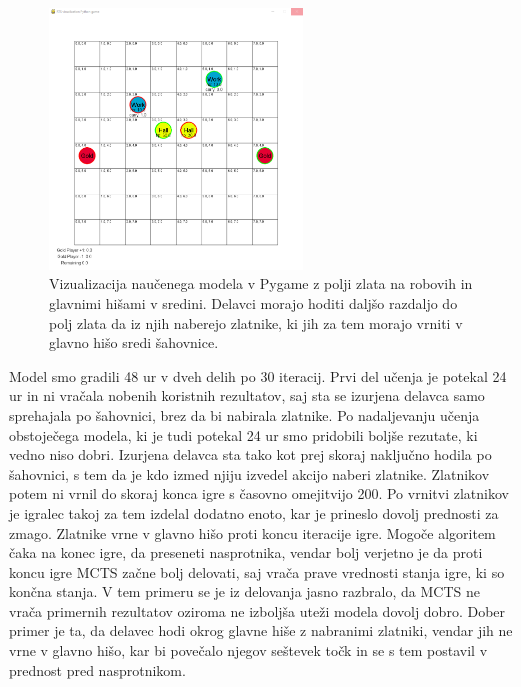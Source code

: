 \documentclass[a4paper, 12pt]{book}
\begin{document}
\begin{figure}[h]
	\begin{center}
		\includegraphics[width=0.6\textwidth]{photos/third-2018-11-14.pdf}
	\end{center}
	\caption{Vizualizacija naučenega modela v Pygame z polji zlata na robovih in glavnimi hišami v sredini. Delavci morajo hoditi daljšo razdaljo do polj zlata da iz njih naberejo zlatnike, ki jih za tem morajo vrniti v glavno hišo sredi šahovnice. }
	\label{vizualizacijaRezultatovSpremembaZlata}
\end{figure}

Model smo gradili 48 ur v dveh delih po 30 iteracij.
Prvi del učenja je potekal 24 ur in ni vračala nobenih koristnih rezultatov, saj sta se izurjena delavca samo sprehajala po šahovnici, brez da bi nabirala zlatnike.
Po nadaljevanju učenja obstoječega modela, ki je tudi potekal 24 ur smo pridobili boljše rezutate, ki vedno niso dobri.
Izurjena delavca sta tako kot prej skoraj naključno hodila po šahovnici, s tem da je kdo izmed njiju izvedel akcijo naberi zlatnike.
Zlatnikov potem ni vrnil do skoraj konca igre s časovno omejitvijo 200. Po vrnitvi zlatnikov je igralec takoj za tem izdelal dodatno enoto, kar je prineslo dovolj prednosti za zmago.
Zlatnike vrne v glavno hišo proti koncu iteracije igre. Mogoče algoritem čaka na konec igre, da preseneti nasprotnika, vendar bolj verjetno je da proti koncu igre MCTS začne bolj delovati, saj vrača prave vrednosti stanja igre, ki so končna stanja.
V tem primeru se je iz delovanja jasno razbralo, da MCTS ne vrača primernih rezultatov oziroma ne izboljša uteži modela dovolj dobro.
Dober primer je ta, da delavec hodi okrog glavne hiše z nabranimi zlatniki, vendar jih ne vrne v glavno hišo, kar bi povečalo njegov seštevek točk in se s tem postavil v prednost pred nasprotnikom.
\end{document}
